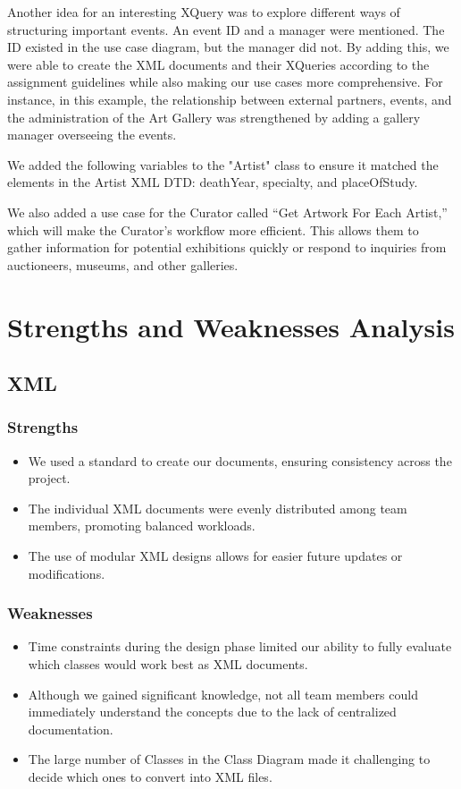 \documentclass{article} %
\begin{document}
Another idea for an interesting XQuery was to explore different ways of structuring 
important events. An event ID and a manager were mentioned. The ID existed in the use 
case diagram, but the manager did not. By adding this, we were able to create the XML 
documents and their XQueries according to the assignment guidelines while also making 
our use cases more comprehensive. For instance, in this example, the relationship 
between external partners, events, and the administration of the Art Gallery was 
strengthened by adding a gallery manager overseeing the events.

We added the following variables to the "Artist" class to ensure it matched the 
elements in the Artist XML DTD: deathYear, specialty, and placeOfStudy.

We also added a use case for the Curator called “Get Artwork For Each Artist,” which 
will make the Curator's workflow more efficient. This allows them to gather 
information for potential exhibitions quickly or respond to inquiries from auctioneers, 
museums, and other galleries.

\section{Strengths and Weaknesses Analysis}

\subsection{XML}

\subsubsection{Strengths}
\begin{itemize}
    \item We used a standard to create our documents, ensuring consistency across the project.
    \item The individual XML documents were evenly distributed among team members, promoting balanced workloads.
    \item The use of modular XML designs allows for easier future updates or modifications.
\end{itemize}

\subsubsection{Weaknesses}
\begin{itemize}
    \item Time constraints during the design phase limited our ability to fully evaluate which classes would work best as XML documents.
    \item Although we gained significant knowledge, not all team members could immediately understand the concepts due to the lack of centralized documentation.
    \item The large number of Classes in the Class Diagram made it challenging to decide which ones to convert into XML files.
\end{itemize}
\end{document}
